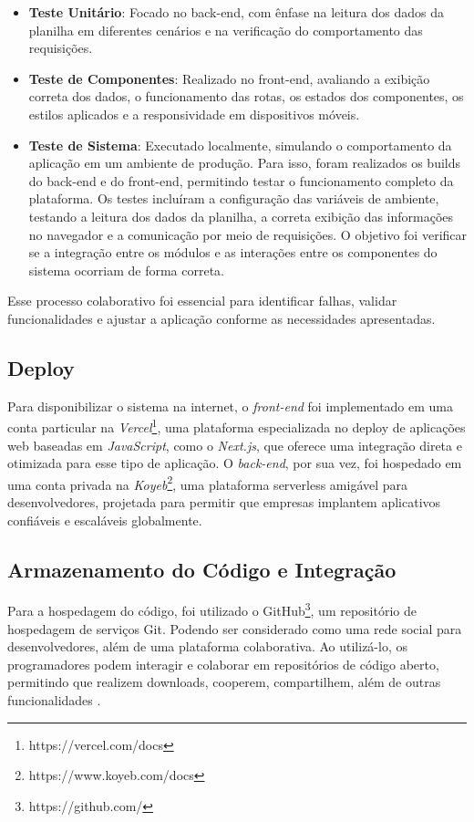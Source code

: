\begin{itemize}
    \item \textbf{Teste Unitário}: Focado no back-end, com ênfase na leitura dos dados da planilha em diferentes cenários e na verificação do comportamento das requisições.
    \item \textbf{Teste de Componentes}: Realizado no front-end, avaliando a exibição correta dos dados, o funcionamento das rotas, os estados dos componentes, os estilos aplicados e a responsividade em dispositivos móveis.
    \item \textbf{Teste de Sistema}: Executado localmente, simulando o comportamento da aplicação em um ambiente de produção. Para isso, foram realizados os builds do back-end e do front-end, permitindo testar o funcionamento completo da plataforma. Os testes incluíram a configuração das variáveis de ambiente, testando a leitura dos dados da planilha, a correta exibição das informações no navegador e a comunicação por meio de requisições. O objetivo foi verificar se a integração entre os módulos e as interações entre os componentes do sistema ocorriam de forma correta.
\end{itemize}

Esse processo colaborativo foi essencial para identificar falhas, validar funcionalidades e ajustar a aplicação conforme as necessidades apresentadas.

\subsection{Deploy}

Para disponibilizar o sistema na internet, o \textit{front-end} foi implementado em uma conta particular na \textit{Vercel}\footnote{https://vercel.com/docs}, uma plataforma especializada no deploy de aplicações web baseadas em \textit{JavaScript}, como o \textit{Next.js}, que oferece uma integração direta e otimizada para esse tipo de aplicação. O \textit{back-end}, por sua vez, foi hospedado em uma conta privada na \textit{Koyeb}\footnote{https://www.koyeb.com/docs}, uma plataforma serverless amigável para desenvolvedores, projetada para permitir que empresas implantem aplicativos confiáveis e escaláveis globalmente.

\subsection{Armazenamento do Código e Integração}

Para a hospedagem do código, foi utilizado o GitHub\footnote{https://github.com/}, um repositório de hospedagem de serviços Git. Podendo ser considerado como uma rede social para desenvolvedores, além de uma plataforma colaborativa. Ao utilizá-lo, os programadores podem interagir e colaborar em repositórios de código aberto, permitindo que realizem downloads, cooperem, compartilhem, além de outras funcionalidades \cite{silva2024biblioteca}.

